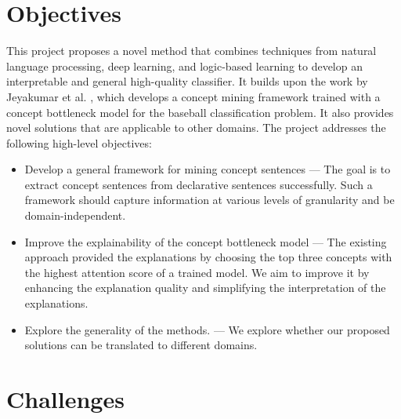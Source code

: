 \section{Objectives}

This project proposes a novel method that combines techniques from natural language processing, deep learning, and logic-based learning to develop an interpretable and general high-quality classifier.
It builds upon the work by Jeyakumar et al. \cite{RefWorks:RefID:16-2021automatic}, which develops a concept mining framework trained with a concept bottleneck model for the baseball classification problem. 
It also provides novel solutions that are applicable to other domains.
The project addresses the following high-level objectives:


\begin{itemize}
    \item Develop a general framework for mining concept sentences --- The goal is to extract concept sentences from declarative sentences successfully. Such a framework should capture information at various levels of granularity and be domain-independent.
    
    \item Improve the explainability of the concept bottleneck model ---  The existing approach provided the explanations by choosing the top three concepts with the highest attention score of a trained model.
    We aim to improve it by enhancing the explanation quality and simplifying the interpretation of the explanations.
    
    \item Explore the generality of the methods. --- We explore whether our proposed solutions can be translated to different domains.
    
\end{itemize}

\section{Challenges}

